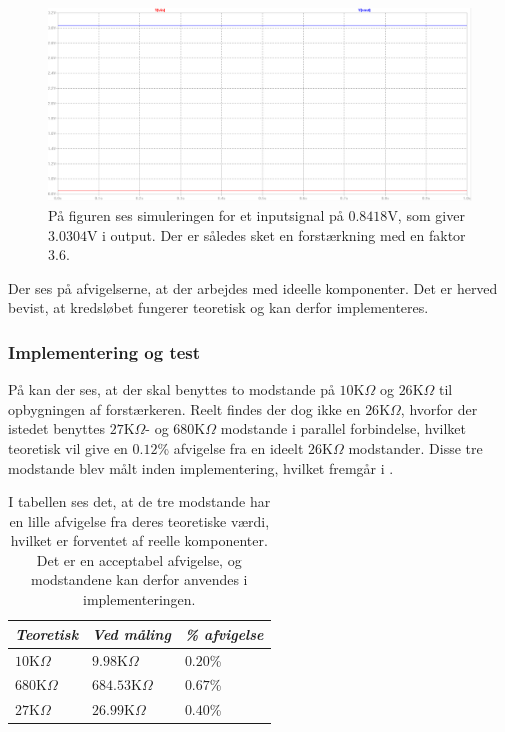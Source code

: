 \begin{figure}[H]
	\centering
	\includegraphics[scale=0.3]{figures/cProblemloesning/Forstaerker_faktor3_simulering.PNG}
	\caption{På figuren ses simuleringen for et inputsignal på $0.8418$V, som giver $3.0304$V i output. Der er således sket en forstærkning med en faktor $3.6$.}
	\label{fig:faktor3_simulering}
\end{figure}
\noindent Der ses på afvigelserne, at der arbejdes med ideelle komponenter. Det er herved bevist, at kredsløbet fungerer teoretisk og kan derfor implementeres.

\subsubsection{Implementering og test}
På  kan der ses, at der skal benyttes to modstande på $10$K$\Omega$ og $26$K$\Omega$ til opbygningen af forstærkeren. Reelt findes der dog ikke en $26$K$\Omega$, hvorfor der istedet benyttes $27$K$\Omega$- og $680$K$\Omega$ modstande i parallel forbindelse, hvilket teoretisk vil give en $0.12$\% afvigelse fra en ideelt $26$K$\Omega$ modstander. Disse tre modstande blev målt inden implementering, hvilket fremgår i .
\begin{table}[H]
	\centering
	\begin{tabular}{|l|l|l|}
		\hline
		\textit{Teoretisk}  & \textit{Ved måling} & \textit{\% afvigelse} \\ \hline
		$10$K$\Omega$       & $9.98$K$\Omega$     & $0.20$\%               \\ \hline
		$680$K$\Omega$      & $684.53$K$\Omega$   & $0.67$\%               \\ \hline
		$27$K$\Omega$       & $26.99$K$\Omega$    & $0.40$\%               \\ \hline
	\end{tabular}
	\caption{I tabellen ses det, at de tre modstande har en lille afvigelse fra deres teoretiske værdi, hvilket er forventet af reelle komponenter. Det er en acceptabel afvigelse, og modstandene kan derfor anvendes i implementeringen.}
	\label{Tab:modstand_faktor18}
\end{table}

